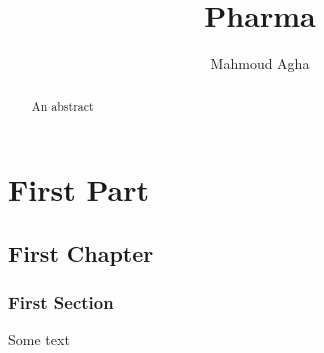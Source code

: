\documentclass[10pt, a4paper]{report}
\author{Mahmoud Agha}
\title{Pharma}
\begin{document}
\maketitle
\tableofcontents
	\begin{abstract}
		An abstract
	\end{abstract}
\part{First Part}
\chapter{First Chapter}
\section{First Section}
Some text\cite{hatzichristou2004efficacy}












 
\end{document}
